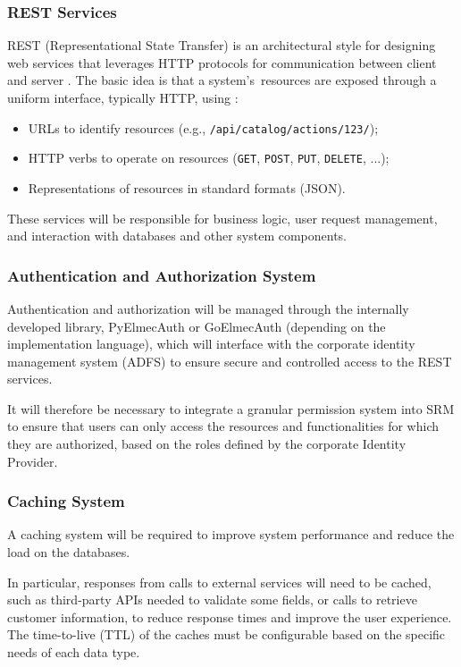 \subsubsection{REST Services}
REST (Representational State Transfer) is an architectural style for designing web services that leverages HTTP protocols for communication between client and server \cite{rest}. The basic idea is that a system's~resources are exposed through a uniform interface, typically HTTP, using \cite{rest}:
\begin{itemize}
 \item URLs to identify resources (e.g., \texttt{/api/catalog/actions/123/});
 \item HTTP verbs to operate on resources (\texttt{GET}, \texttt{POST}, \texttt{PUT}, \texttt{DELETE}, ...);
 \item Representations of resources in standard formats (JSON).
\end{itemize}

These services will be responsible for business logic, user request management, and interaction with databases and other system components.

\subsubsection{Authentication and Authorization System}
Authentication and authorization will be managed through the internally developed library, PyElmecAuth or GoElmecAuth (depending on the implementation language), which will interface with the corporate identity management system (ADFS) to ensure secure and controlled access to the REST services.

It will therefore be necessary to integrate a granular permission system into SRM to ensure that users can only access the resources and functionalities for which they are authorized, based on the roles defined by the corporate Identity Provider.

\subsubsection{Caching System}
A caching system will be required to improve system performance and reduce the load on the databases.

In particular, responses from calls to external services will need to be cached, such as third-party APIs needed to validate some fields, or calls to retrieve customer information, to reduce response times and improve the user experience. The time-to-live (TTL) of the caches must be configurable based on the specific needs of each data type.

